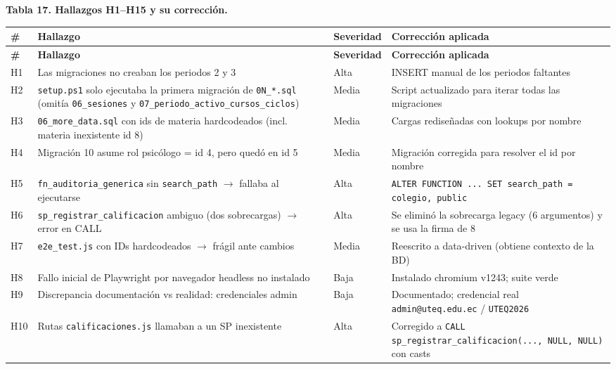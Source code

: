 \documentclass[11pt,a4paper]{article}
\begin{document}
\textbf{Tabla 17. Hallazgos H1--H15 y su corrección.}


{\small
\begin{longtable}{|p{}|p{}|p{}|p{}|}
\rowcolor{UTECblue}\color{white}\bfseries \# & \color{white}\bfseries Hallazgo & \color{white}\bfseries Severidad & \color{white}\bfseries Corrección aplicada \\ \hline
\endfirsthead
\rowcolor{UTECblue}\color{white}\bfseries \# & \color{white}\bfseries Hallazgo & \color{white}\bfseries Severidad & \color{white}\bfseries Corrección aplicada \\ \hline
\endhead
H1 & Las migraciones no creaban los periodos 2 y 3 & Alta & INSERT manual de los periodos faltantes \\ \hline
H2 & \texttt{setup.ps1} solo ejecutaba la primera migración de \texttt{0N\_*.sql} (omitía \texttt{06\_sesiones} y \texttt{07\_periodo\_activo\_cursos\_ciclos}) & Media & Script actualizado para iterar todas las migraciones \\ \hline
H3 & \texttt{06\_more\_data.sql} con ids de materia hardcodeados (incl. materia inexistente id 8) & Media & Cargas rediseñadas con lookups por nombre \\ \hline
H4 & Migración 10 asume rol psicólogo = id 4, pero quedó en id 5 & Media & Migración corregida para resolver el id por nombre \\ \hline
H5 & \texttt{fn\_auditoria\_generica} sin \texttt{search\_path} {$\rightarrow$} fallaba al ejecutarse & Alta & \texttt{ALTER FUNCTION ... SET search\_path = colegio, public} \\ \hline
H6 & \texttt{sp\_registrar\_calificacion} ambiguo (dos sobrecargas) {$\rightarrow$} error en CALL & Alta & Se eliminó la sobrecarga legacy (6 argumentos) y se usa la firma de 8 \\ \hline
H7 & \texttt{e2e\_test.js} con IDs hardcodeados {$\rightarrow$} frágil ante cambios & Media & Reescrito a data-driven (obtiene contexto de la BD) \\ \hline
H8 & Fallo inicial de Playwright por navegador headless no instalado & Baja & Instalado chromium v1243; suite verde \\ \hline
H9 & Discrepancia documentación vs realidad: credenciales admin & Baja & Documentado; credencial real \texttt{admin@uteq.edu.ec} / \texttt{UTEQ2026} \\ \hline
H10 & Rutas \texttt{calificaciones.js} llamaban a un SP inexistente & Alta & Corregido a \texttt{CALL sp\_registrar\_calificacion(..., NULL, NULL)} con casts \\ \hline

\end{longtable}}
\end{document}
